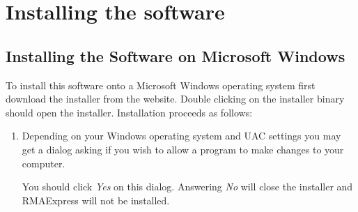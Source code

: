 \documentclass[11pt]{report}
\begin{document}
\section{Installing the software}

\subsection{Installing the Software on Microsoft Windows}
To install this software onto a Microsoft Windows operating system first download the installer from the website. Double clicking on the installer binary should open the installer. Installation proceeds as follows:
\begin{enumerate}
\item Depending on your Windows operating system and UAC settings you may get a dialog asking if you wish to allow a program to make changes to your computer.

You should click {\it Yes} on this dialog. Answering {\it No} will close the installer and RMAExpress will not be installed. 


\end{enumerate}
\end{document}
